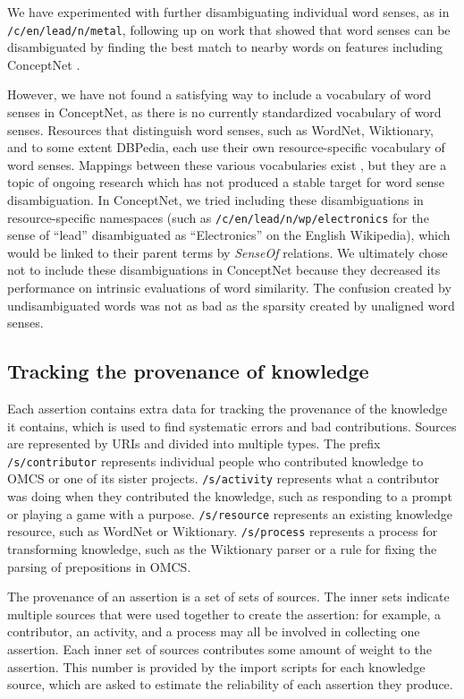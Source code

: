 \documentclass[letterpaper]{article}
\begin{document}
We have experimented with further disambiguating individual word senses,
as in \texttt{/c/en/lead/n/metal}, following up on work that showed that
word senses can be disambiguated by finding the best match to nearby
words on features including ConceptNet \cite{havasi2010coarse}.

However, we have not found a satisfying way to include a vocabulary of
word senses in ConceptNet, as there is no currently standardized
vocabulary of word senses. Resources that distinguish word senses, such
as WordNet, Wiktionary, and to some extent DBPedia, each use their own
resource-specific vocabulary of word senses. Mappings between these
various vocabularies exist \cite{miller2014alignment}, but they are a
topic of ongoing research which has not produced a stable target for
word sense disambiguation. In ConceptNet, we tried including these
disambiguations in resource-specific namespaces (such as
\texttt{/c/en/lead/n/wp/electronics} for the sense of ``lead''
disambiguated as ``Electronics'' on the English Wikipedia), which would
be linked to their parent terms by \emph{SenseOf} relations. We
ultimately chose not to include these disambiguations in ConceptNet
because they decreased its performance on intrinsic evaluations of word
similarity. The confusion created by undisambiguated words was not as
bad as the sparsity created by unaligned word senses.


\subsection{Tracking the provenance of knowledge}\label{provenance}

Each assertion contains extra data for tracking the provenance of the
knowledge it contains, which is used to find systematic errors and bad
contributions. Sources are represented by URIs and divided into multiple
types. The prefix \texttt{/s/contributor} represents individual people
who contributed knowledge to OMCS or one of its sister projects.
\texttt{/s/activity} represents what a contributor was doing when they
contributed the knowledge, such as responding to a prompt or playing a
game with a purpose. \texttt{/s/resource} represents an existing
knowledge resource, such as WordNet or Wiktionary. \texttt{/s/process}
represents a process for transforming knowledge, such as the Wiktionary
parser or a rule for fixing the parsing of prepositions in OMCS.

The provenance of an assertion is a set of sets of sources. The inner
sets indicate multiple sources that were used together to create the
assertion: for example, a contributor, an activity, and a process may
all be involved in collecting one assertion. Each inner set of sources
contributes some amount of weight to the assertion. This number is
provided by the import scripts for each knowledge source, which are
asked to estimate the reliability of each assertion they produce.
\end{document}
